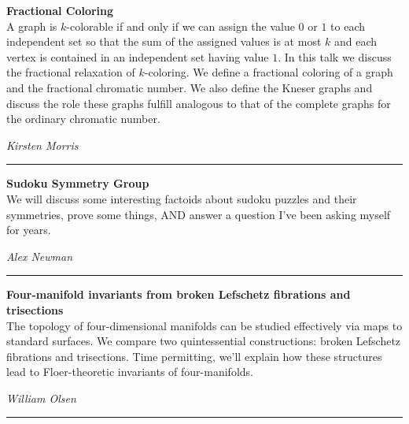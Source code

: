 \documentclass[oneside]{amsart}
\begin{document}
\filbreak
\hspace{-20pt}\textbf{ \textbf{ Fractional Coloring } } \vspace{0.5em}\\
A graph is $k$-colorable if and only if we can assign the value $0$ or $1$ to each independent set so that the sum of the assigned values is at most $k$ and each vertex is contained in an independent set having value $1$. In this talk we discuss the fractional relaxation of $k$-coloring. We define a fractional coloring of a graph and the fractional chromatic number. We also define the Kneser graphs and discuss the role these graphs fulfill analogous to that of the complete graphs for the ordinary chromatic number. \vspace{-1em}\\
\begin{flushright} \textit{ Kirsten Morris } \vspace{0.5em} \end{flushright}
\rule{\textwidth}{0.4pt}
\vspace{0.5em}

\filbreak
\hspace{-20pt}\textbf{ \textbf{ Sudoku Symmetry Group } } \vspace{0.5em}\\
We will discuss some interesting factoids about sudoku puzzles and their symmetries, prove some things, AND answer a question I've been asking myself for years. \vspace{-1em}\\
\begin{flushright} \textit{ Alex Newman } \vspace{0.5em} \end{flushright}
\rule{\textwidth}{0.4pt}
\vspace{0.5em}

\filbreak
\hspace{-20pt}\textbf{ \textbf{ Four-manifold invariants from broken Lefschetz fibrations and trisections } } \vspace{0.5em}\\
The topology of four-dimensional manifolds can be studied effectively via maps to standard surfaces. We compare two quintessential constructions: broken Lefschetz fibrations and trisections. Time permitting, we'll explain how these structures lead to Floer-theoretic invariants of four-manifolds. \vspace{-1em}\\
\begin{flushright} \textit{ William Olsen } \vspace{0.5em} \end{flushright}
\rule{\textwidth}{0.4pt}
\vspace{0.5em}
\end{document}

